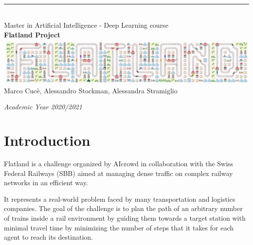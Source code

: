 \documentclass[12pt]{article}
\begin{document}


\begin{titlepage}

\newcommand{\HRule}{\rule{\linewidth}{0.3mm}} 							%
\center 

\vspace*{15mm} 
\\[0.3cm]
\HRule \\[0.4cm]
\textsf{Master in Artificial Intelligence - Deep Learning course}\\[2cm]


{ \huge\textbf{Flatland Project} }\\[1.5cm]							
\includegraphics[scale=0.50]{res/title.png}\\[1cm] 
\textsf{Marco Cucè, Alessandro Stockman, Alessandra Stramiglio}\\
\vspace{8cm}
\vfill

\textit{Academic Year 2020/2021} 


\end{titlepage}


\tableofcontents
\newpage
\listoffigures
\newpage


\section{Introduction}

Flatland \cite{flatland-challenge} is a challenge organized by AIcrowd in collaboration with the Swiss Federal Railways (SBB) aimed at managing dense traffic on complex railway networks in an efficient way.

It represents a real-world problem faced by many transportation and logistics companies. The goal of the challenge is to plan the path of an arbitrary number of trains inside a rail environment by guiding them towards a target station with minimal travel time by minimizing the number of steps that it takes for each agent to reach its destination. 
\end{document}
